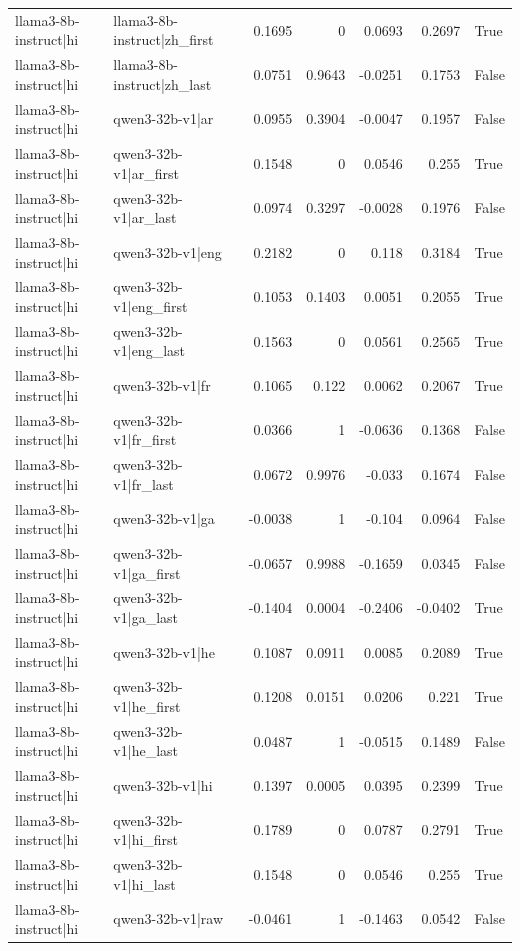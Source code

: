 \begin{table}
\begin{tabular}{l l r r r r l}
llama3-8b-instruct|hi & llama3-8b-instruct|zh_first & 0.1695 & 0 & 0.0693 & 0.2697 & True \\
llama3-8b-instruct|hi & llama3-8b-instruct|zh_last & 0.0751 & 0.9643 & -0.0251 & 0.1753 & False \\
llama3-8b-instruct|hi & qwen3-32b-v1|ar & 0.0955 & 0.3904 & -0.0047 & 0.1957 & False \\
llama3-8b-instruct|hi & qwen3-32b-v1|ar_first & 0.1548 & 0 & 0.0546 & 0.255 & True \\
llama3-8b-instruct|hi & qwen3-32b-v1|ar_last & 0.0974 & 0.3297 & -0.0028 & 0.1976 & False \\
llama3-8b-instruct|hi & qwen3-32b-v1|eng & 0.2182 & 0 & 0.118 & 0.3184 & True \\
llama3-8b-instruct|hi & qwen3-32b-v1|eng_first & 0.1053 & 0.1403 & 0.0051 & 0.2055 & True \\
llama3-8b-instruct|hi & qwen3-32b-v1|eng_last & 0.1563 & 0 & 0.0561 & 0.2565 & True \\
llama3-8b-instruct|hi & qwen3-32b-v1|fr & 0.1065 & 0.122 & 0.0062 & 0.2067 & True \\
llama3-8b-instruct|hi & qwen3-32b-v1|fr_first & 0.0366 & 1 & -0.0636 & 0.1368 & False \\
llama3-8b-instruct|hi & qwen3-32b-v1|fr_last & 0.0672 & 0.9976 & -0.033 & 0.1674 & False \\
llama3-8b-instruct|hi & qwen3-32b-v1|ga & -0.0038 & 1 & -0.104 & 0.0964 & False \\
llama3-8b-instruct|hi & qwen3-32b-v1|ga_first & -0.0657 & 0.9988 & -0.1659 & 0.0345 & False \\
llama3-8b-instruct|hi & qwen3-32b-v1|ga_last & -0.1404 & 0.0004 & -0.2406 & -0.0402 & True \\
llama3-8b-instruct|hi & qwen3-32b-v1|he & 0.1087 & 0.0911 & 0.0085 & 0.2089 & True \\
llama3-8b-instruct|hi & qwen3-32b-v1|he_first & 0.1208 & 0.0151 & 0.0206 & 0.221 & True \\
llama3-8b-instruct|hi & qwen3-32b-v1|he_last & 0.0487 & 1 & -0.0515 & 0.1489 & False \\
llama3-8b-instruct|hi & qwen3-32b-v1|hi & 0.1397 & 0.0005 & 0.0395 & 0.2399 & True \\
llama3-8b-instruct|hi & qwen3-32b-v1|hi_first & 0.1789 & 0 & 0.0787 & 0.2791 & True \\
llama3-8b-instruct|hi & qwen3-32b-v1|hi_last & 0.1548 & 0 & 0.0546 & 0.255 & True \\
llama3-8b-instruct|hi & qwen3-32b-v1|raw & -0.0461 & 1 & -0.1463 & 0.0542 & False \\

\end{tabular}
\end{table}
